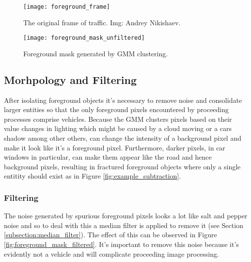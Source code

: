 \begin{figure*}[htbp]
    \centering 
    \begin{subfigure}[b]{0.45\textwidth}
        \texttt{[image: foreground\_frame]}
        \captionsetup{format = hang}
        \caption{The original frame of traffic. Img: Andrey Nikishaev.}
        \label{fig:frame_original}
    \end{subfigure}
    \begin{subfigure}[b]{0.45\textwidth}
        \texttt{[image: foreground\_mask\_unfiltered]}
        \captionsetup{format = hang}
        \caption{Foreground mask generated by GMM clustering.}
        \label{fig:foreground_mask_unfiltered}
    \end{subfigure}
    \captionsetup{format=hang}
    \caption{A foreground mask generated from a traffic scene by OpenCV's GMM implementation.}
    \label{fig:example_subtraction}
\end{figure*}



\subsection{Morhpology and Filtering}

After isolating foreground objects it's necessary to remove noise and consolidate larger entities so that the only foreground pixels encountered by proceeding processes comprise vehicles. Because the GMM clusters pixels based on their value changes in lighting which might be caused by a cloud moving or a cars shadow among other others, can change the intensity of a background pixel and make it look like it's a foreground pixel. Furthermore, darker pixels, in car windows in particular, can make them appear like the road and hence background pixels, resulting in fractured foreground objects where only a single entitity should exist as in Figure \ref{fig:example_subtraction}.

\subsubsection{Filtering}

The noise generated by spurious foreground pixels looks a lot like salt and pepper noise and so to deal with this a median filter is applied to remove it (see Section \ref{subsection:median_filter}). The effect of this can be observed in Figure \ref{fig:foreground_mask_filtered}. It's important to remove this noise because it's evidently not a vehicle and will complicate proceeding image processing. 

